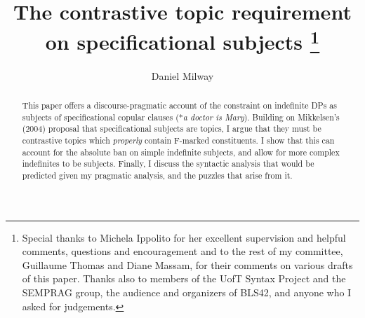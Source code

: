 \documentclass[
]{RCL}
\title{The contrastive topic requirement on specificational subjects
\thanks{
Special thanks to Michela Ippolito for her excellent supervision and helpful comments, questions and encouragement and to the rest of my committee, Guillaume Thomas and Diane Massam, for their comments on various drafts of this paper.
Thanks also to members of the UofT Syntax Project and the SEMPRAG group, the audience and organizers of BLS42, and anyone who I asked for judgements.
}
}
\author{Daniel Milway
}
\date{}
\begin{document}
\maketitle
\begin{abstract}
  This paper offers a discourse-pragmatic account of the constraint on indefinite DPs as subjects of specificational copular clauses (*\textit{a doctor is Mary}).
  Building on Mikkelsen's (2004) proposal that specificational subjects are topics, I argue that they must be contrastive topics which \textit{properly} contain F-marked constituents.
  I show that this can account for the absolute ban on simple indefinite subjects, and allow for more complex indefinites to be subjects.
  Finally, I discuss the syntactic analysis that would be predicted given my pragmatic analysis, and the puzzles that arise from it.
\end{abstract}
\end{document}
